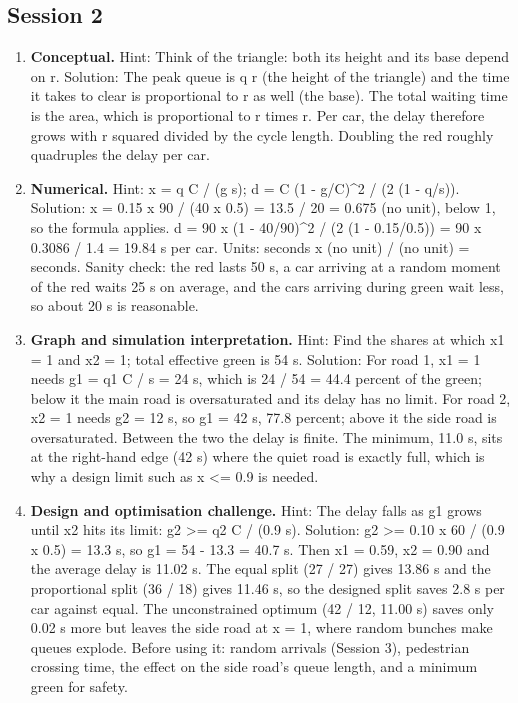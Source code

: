 \documentclass[11pt,a4paper]{article}
\begin{document}
\subsection*{Session 2}
\begin{enumerate}[nosep]
\item \textbf{Conceptual.} Hint: Think of the triangle: both its height and its base depend on r. Solution: The peak queue is q r (the height of the triangle) and the time it takes to clear is proportional to r as well (the base). The total waiting time is the area, which is proportional to r times r. Per car, the delay therefore grows with r squared divided by the cycle length. Doubling the red roughly quadruples the delay per car.
\item \textbf{Numerical.} Hint: x = q C / (g s); d = C (1 - g/C)\textasciicircum{}2 / (2 (1 - q/s)). Solution: x = 0.15 x 90 / (40 x 0.5) = 13.5 / 20 = 0.675 (no unit), below 1, so the formula applies. d = 90 x (1 - 40/90)\textasciicircum{}2 / (2 (1 - 0.15/0.5)) = 90 x 0.3086 / 1.4 = 19.84 s per car. Units: seconds x (no unit) / (no unit) = seconds. Sanity check: the red lasts 50 s, a car arriving at a random moment of the red waits 25 s on average, and the cars arriving during green wait less, so about 20 s is reasonable.
\item \textbf{Graph and simulation interpretation.} Hint: Find the shares at which x1 = 1 and x2 = 1; total effective green is 54 s. Solution: For road 1, x1 = 1 needs g1 = q1 C / s = 24 s, which is 24 / 54 = 44.4 percent of the green; below it the main road is oversaturated and its delay has no limit. For road 2, x2 = 1 needs g2 = 12 s, so g1 = 42 s, 77.8 percent; above it the side road is oversaturated. Between the two the delay is finite. The minimum, 11.0 s, sits at the right-hand edge (42 s) where the quiet road is exactly full, which is why a design limit such as x \textless{}= 0.9 is needed.
\item \textbf{Design and optimisation challenge.} Hint: The delay falls as g1 grows until x2 hits its limit: g2 \textgreater{}= q2 C / (0.9 s). Solution: g2 \textgreater{}= 0.10 x 60 / (0.9 x 0.5) = 13.3 s, so g1 = 54 - 13.3 = 40.7 s. Then x1 = 0.59, x2 = 0.90 and the average delay is 11.02 s. The equal split (27 / 27) gives 13.86 s and the proportional split (36 / 18) gives 11.46 s, so the designed split saves 2.8 s per car against equal. The unconstrained optimum (42 / 12, 11.00 s) saves only 0.02 s more but leaves the side road at x = 1, where random bunches make queues explode. Before using it: random arrivals (Session 3), pedestrian crossing time, the effect on the side road's queue length, and a minimum green for safety.
\end{enumerate}
\end{document}
